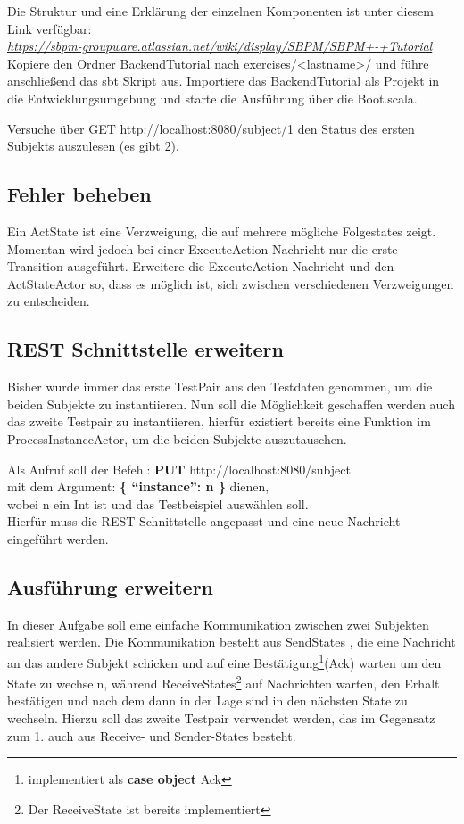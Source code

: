 \documentclass[11pt]{tudexercise}
\newcommand{\link}[1]{\\ \textcolor{blue}{\textit{\url{#1}}}}
\begin{document}
  Die Struktur und eine Erklärung der einzelnen Komponenten ist unter diesem Link verfügbar:
  \link{https://sbpm-groupware.atlassian.net/wiki/display/SBPM/SBPM+-+Tutorial}\\
  Kopiere den Ordner BackendTutorial nach exercises/<lastname>/ und führe anschließend das sbt Skript aus.
  Importiere das BackendTutorial als Projekt in die Entwicklungsumgebung und starte die Ausführung
  über die Boot.scala.

  Versuche über GET http://localhost:8080/subject/1 den Status des ersten Subjekts auszulesen (es gibt 2).
  
  \subsection{Fehler beheben}
  Ein ActState ist eine Verzweigung, die auf mehrere mögliche Folgestates zeigt. Momentan wird jedoch bei
  einer ExecuteAction-Nachricht nur die erste Transition ausgeführt. Erweitere die ExecuteAction-Nachricht
  und den ActStateActor so, dass es möglich ist, sich zwischen verschiedenen Verzweigungen zu entscheiden.
  
  \subsection{REST Schnittstelle erweitern}
  Bisher wurde immer das erste TestPair aus den Testdaten genommen, um die beiden Subjekte zu instantiieren.
  Nun soll die Möglichkeit geschaffen werden auch das zweite Testpair zu instantiieren,
  hierfür existiert bereits eine Funktion im ProcessInstanceActor,
  um die beiden Subjekte auszutauschen.
  
  Als Aufruf soll der Befehl:
  \textbf{PUT} http://localhost:8080/subject\\
  mit dem Argument: \textbf{\{ “instance”: n \}} dienen,\\
  wobei n ein Int ist und das Testbeispiel auswählen soll.\\
  Hierfür muss die REST-Schnittstelle angepasst und eine neue Nachricht eingeführt werden.
  
  \subsection{Ausführung erweitern}
  In dieser Aufgabe soll eine einfache Kommunikation zwischen zwei Subjekten realisiert werden.
  Die Kommunikation besteht aus SendStates , die eine Nachricht an das andere Subjekt schicken
  und auf eine Bestätigung\footnote{implementiert als \textbf{case object} Ack}(Ack) warten um den State zu wechseln,
  während ReceiveStates\footnote{Der ReceiveState ist bereits implementiert}
  auf Nachrichten warten, den Erhalt bestätigen und nach dem dann in der Lage sind
  in den nächsten State zu wechseln. Hierzu soll das zweite Testpair verwendet werden,
  das im Gegensatz zum 1. auch aus Receive- und Sender-States besteht.
  
\end{document}
